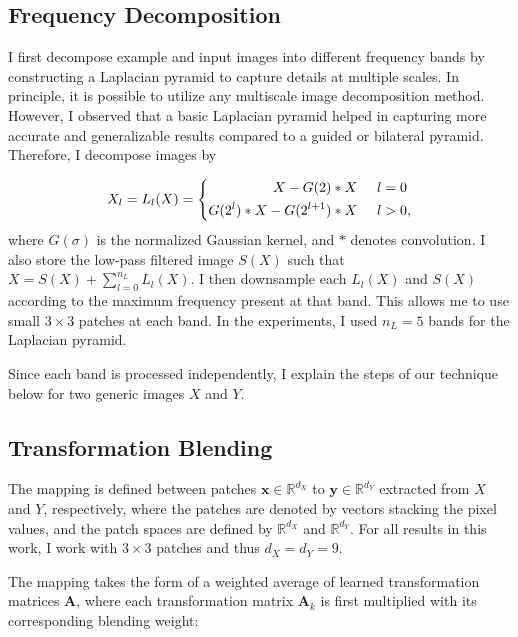 \subsection{Frequency Decomposition}\label{sec:thePatchMap}

I first decompose example and input images into different frequency bands by constructing a Laplacian pyramid to capture details at multiple scales. In principle, it is possible to utilize any multiscale image decomposition method. However, I observed that a basic Laplacian pyramid helped in capturing more accurate and generalizable results compared to a guided or bilateral pyramid. Therefore, I decompose images by

\begin{equation} 
	X_l = L_l(X) = 
 \left \{ \begin{aligned}
        X - G(2) \ast X \hspace{5mm} &l=0\\
        G(2^l) \ast X - G(2^{l+1}) \ast X \hspace{5mm} &l>0,
       \end{aligned}
 \right.
\end{equation}
where $G(\sigma)$ is the normalized Gaussian kernel, and $\ast$ denotes convolution. I also store the low-pass filtered image $S(X)$ such that $X = S(X) + \sum_{l=0}^{n_L} L_l(X)$. I then downsample each $L_l(X)$ and $S(X)$ according to the maximum frequency present at that band. This allows me to use small $3 \times 3$ patches at each band. In the experiments, I used $n_L = 5$ bands for the Laplacian pyramid.


Since each band is processed independently, I explain the steps of our technique below for two generic images $X$ and $Y$.


\subsection{Transformation Blending}\label{sec:Blending}

The mapping is defined between patches $\mathbf{x} \in \mathbb{R}^{d_X}$ to $\mathbf{y} \in \mathbb{R}^{d_Y}$ extracted from $X$ and $Y$, respectively, where the patches are denoted by vectors stacking the pixel values, and the patch spaces are defined by $\mathbb{R}^{d_X}$ and  $\mathbb{R}^{d_Y}$. For all results in this work, I work with $3 \times 3$ patches and thus $d_X = d_Y = 9$.

The mapping takes the form of a weighted average of learned transformation matrices $\mathbf{A}$, where each transformation matrix $\mathbf{A}_k$ is first multiplied with its corresponding blending weight: 

